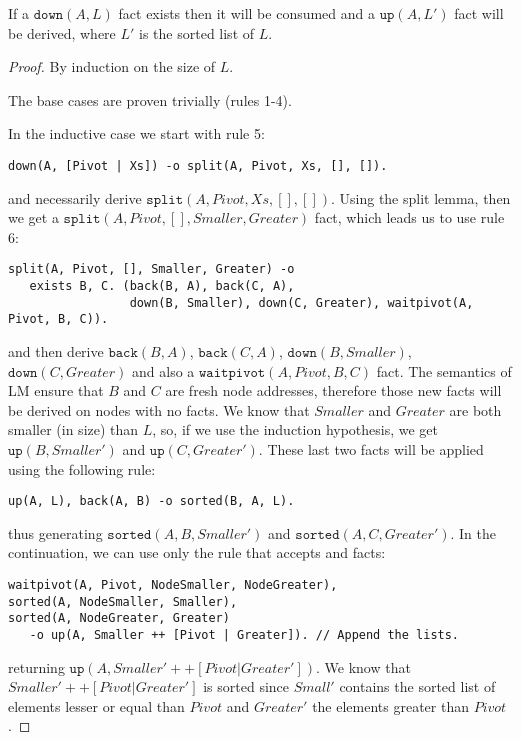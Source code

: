 \begin{theorem}

If a $\mathtt{down}(A, L)$ fact exists then it will be consumed and a
$\mathtt{up}(A, L')$ fact will be derived, where $L'$ is the sorted list of $L$.

\end{theorem}
\begin{proof}
By induction on the size of $L$.

The base cases are proven trivially (rules 1-4).

In the inductive case we start with rule 5:
\begin{Verbatim}[fontsize=\codesize]
down(A, [Pivot | Xs]) -o split(A, Pivot, Xs, [], []).
\end{Verbatim}

and necessarily derive $\mathtt{split}(A, Pivot, Xs, [], [])$. Using the split
lemma, then we get a $\mathtt{split}(A, Pivot, [], Smaller, Greater)$ fact,
which leads us to use rule 6:

\begin{Verbatim}[fontsize=\codesize]
split(A, Pivot, [], Smaller, Greater) -o
   exists B, C. (back(B, A), back(C, A),
                 down(B, Smaller), down(C, Greater), waitpivot(A, Pivot, B, C)).
\end{Verbatim}

and then derive $\mathtt{back}(B, A)$, $\mathtt{back}(C, A)$, $\mathtt{down}(B,
Smaller)$, $\mathtt{down}(C, Greater)$ and also a $\mathtt{waitpivot}(A, Pivot, B, C)$ fact. The semantics of LM ensure that $B$ and $C$ are fresh node
addresses, therefore those new facts will be derived on nodes with no facts. We
know that $Smaller$ and $Greater$ are both smaller (in size) than $L$, so, if we
use the induction hypothesis, we get $\mathtt{up}(B, Smaller')$ and
$\mathtt{up}(C, Greater')$.  These last two facts will be applied using the
following rule:

\begin{Verbatim}[fontsize=\codesize]
up(A, L), back(A, B) -o sorted(B, A, L).
\end{Verbatim}

thus generating $\mathtt{sorted}(A, B, Smaller')$ and $\mathtt{sorted}(A, C,
Greater')$. In the continuation, we can use only the rule that accepts
 and  facts:

\begin{Verbatim}[fontsize=\codesize]
waitpivot(A, Pivot, NodeSmaller, NodeGreater),
sorted(A, NodeSmaller, Smaller),
sorted(A, NodeGreater, Greater)
   -o up(A, Smaller ++ [Pivot | Greater]). // Append the lists.
\end{Verbatim}

returning $\mathtt{up}(A, Smaller' ++ [Pivot | Greater'])$.  We know that
$Smaller' ++ [Pivot | Greater']$ is sorted since $Small'$ contains the sorted
list of elements lesser or equal than $Pivot$ and $Greater'$ the elements
greater than $Pivot$.

\end{proof}

